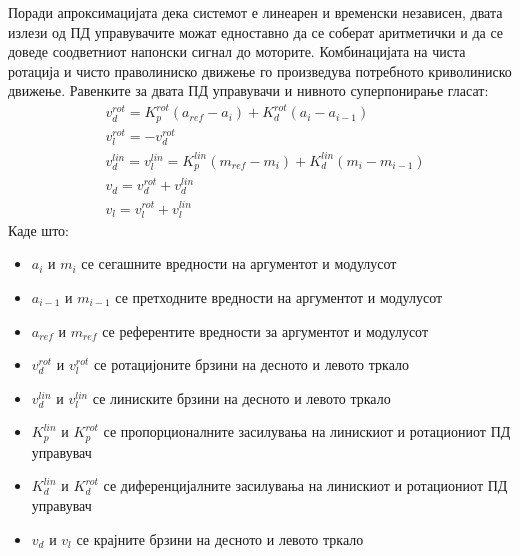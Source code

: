 \documentclass[11pt]{article}
\begin{document}
      Поради апроксимацијата дека системот е линеарен и временски независен, двата излези од ПД управувачите можат едноставно да се соберат аритметички и да се доведе соодветниот напонски сигнал до моторите. Комбинацијата на чиста ротација и чисто праволиниско движење го произведува потребното криволиниско движење. Равенките за двата ПД управувачи и нивното суперпонирање гласат:
      \begin{align}
        & v_d^{rot} = K_p^{rot}(a_{ref} - a_i) + K_d^{rot}(a_i - a_{i-1}) \nonumber\\
        & v_l^{rot} = -v_d^{rot} \nonumber\\
        & v_d^{lin} = v_l^{lin} = K_p^{lin}(m_{ref} - m_i) + K_d^{lin}(m_i - m_{i-1}) \\
        & v_d = v_d^{rot} + v_d^{lin} \nonumber \\
        & v_l = v_l^{rot} + v_l^{lin} \nonumber
      \end{align}
      Каде што:
      \begin{itemize}
        \item $a_i$ и $m_i$ се сегашните вредности на аргументот и модулусот
        \item $a_{i-1}$ и $m_{i-1}$ се претходните вредности на аргументот и модулусот
        \item $a_{ref}$ и $m_{ref}$ се референтите вредности за аргументот и модулусот
        \item $v_d^{rot}$ и $v_l^{rot}$ се ротацијоните брзини на десното и левото тркало
        \item $v_d^{lin}$ и $v_l^{lin}$ се линиските брзини на десното и левото тркало
        \item $K_p^{lin}$ и $K_p^{rot}$ се пропорционалните засилувања на линискиот и ротациониот ПД управувач
        \item $K_d^{lin}$ и $K_d^{rot}$ се диференцијалните засилувања на линискиот и ротациониот ПД управувач
        \item $v_d$ и $v_l$ се крајните брзини на десното и левото тркало
      \end{itemize}

\end{document}
